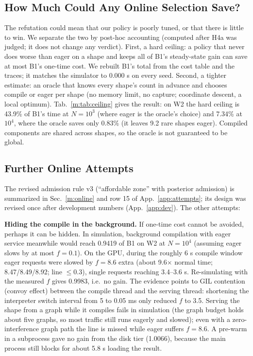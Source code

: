 \documentclass[conference]{IEEEtran}
\newcommand{\tn}[1]{#1}%
\begin{document}
\subsection{How Much Could Any Online Selection Save?}\label{sec:ceiling}
The refutation could mean that our policy is poorly tuned, or that there is little to win. We separate the two by post-hoc accounting (computed after H4a was judged; it does not change any verdict). First, a hard ceiling: a policy that never does worse than eager on a shape and keeps all of B1's steady-state gain can save at most B1's one-time cost. We rebuilt B1's total from the cost table and the traces; it matches the simulator to \tn{0.000 s} on every seed. Second, a tighter estimate: an oracle that knows every shape's count in advance and chooses compile or eager per shape (no memory limit, no capture; coordinate descent, a local optimum). Tab.~\ref{m:tab:ceiling} gives the result: on W2 the hard ceiling is \tn{43.9\%} of B1's time at $N{=}10^3$ (where eager is the oracle's choice) and \tn{7.34\%} at $10^4$, where the oracle saves only \tn{0.83\%} (it leaves \tn{9.2} rare shapes eager). Compiled components are shared across shapes, so the oracle is not guaranteed to be global.




\subsection{Further Online Attempts}\label{sec:attempts}
The revised admission rule v3 (``affordable zone'' with posterior admission) is summarized in Sec.~\ref{m:online} and row 15 of App.~\ref{app:attempts}; its design was revised once after development numbers (App.~\ref{app:dev}). The other attempts:




\textbf{Hiding the compile in the background.} If one-time cost cannot be avoided, perhaps it can be hidden. In simulation, background compilation with eager service meanwhile would reach \tn{0.9419} of B1 on W2 at $N{=}10^4$ (assuming eager slows by at most $f{=}0.1$). On the GPU, during the roughly 6 s compile window eager requests were slowed by $f{=}$\tn{8.6} extra (about \tn{9.6}$\times$ normal time; \tn{8.47}/\tn{8.49}/\tn{8.92}; line $\le$0.3), single requests reaching \tn{3.4--3.6 s}. Re-simulating with the measured $f$ gives \tn{0.9983}, i.e.\ no gain. The evidence points to GIL contention (convoy effect) between the compile thread and the serving thread: shortening the interpreter switch interval from 5 to 0.05 ms only reduced $f$ to \tn{3.5}. Serving the shape from a graph while it compiles fails in simulation (the graph budget holds about five graphs, so most traffic still runs eagerly and slowed); even with a zero-interference graph path the line is missed while eager suffers $f{=}8.6$. A pre-warm in a subprocess gave no gain from the disk tier (\tn{1.0066}), because the main process still blocks for about \tn{5.8 s} loading the result.
\end{document}
